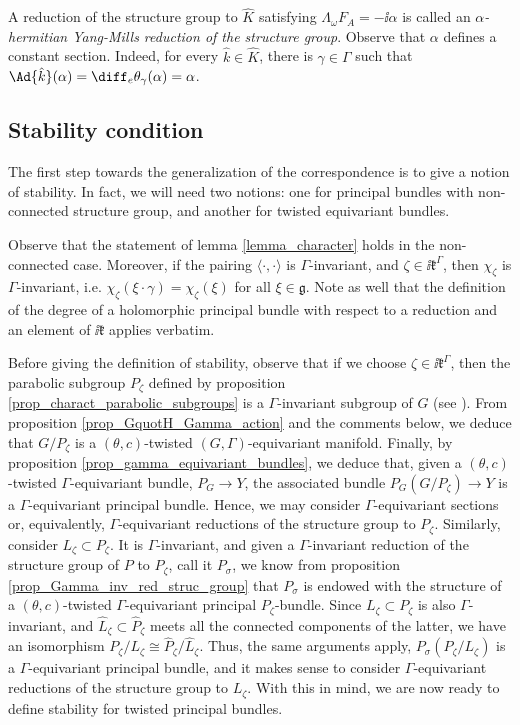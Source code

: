 \begin{obs}
    A reduction of the structure group to \(\hat{K}\) satisfying \(\Lambda_\omega F_A=-\ii \alpha\) is called an \(\alpha\)\textit{-hermitian Yang-Mills reduction of the structure group}. Observe that \(\alpha\) defines a constant section. Indeed, for every \(\hat{k}\in \hat{K}\), there is \(\gamma \in \Gamma\) such that \(\Ad{\hat{k}}(\alpha)=\diff_e \theta_{\gamma}(\alpha)=\alpha\).
\end{obs}

\subsection{Stability condition}
The first step towards the generalization of the correspondence is to give a notion of stability. In fact, we will need two notions: one for principal bundles with non-connected structure group, and another for twisted equivariant bundles. 

Observe that the statement of lemma \ref{lemma_character} holds in the non-connected case. Moreover, if the pairing \(\langle \cdot, \cdot \rangle\) is \(\Gamma\)-invariant, and \(\zeta \in \ii \mathfrak{k}^\Gamma\), then \(\chi_\zeta\) is \(\Gamma\)-invariant, i.e. \(\chi_\zeta(\xi \cdot \gamma)=\chi_\zeta(\xi)\) for all \(\xi \in \mathfrak{g}\). Note as well that the definition of the degree of a holomorphic principal bundle with respect to a reduction and an element of \(\ii \mathfrak{k}\) applies verbatim. 

Before giving the definition of stability, observe that if we choose \(\zeta \in \ii \mathfrak{k}^\Gamma\), then the parabolic subgroup \(P_\zeta\) defined by proposition \ref{prop_charact_parabolic_subgroups} is a \(\Gamma\)-invariant subgroup of \(G\) (see \parencite[Prop. 2.12]{HKnonconnected}). From proposition \ref{prop_GquotH_Gamma_action} and the comments below, we deduce that \(G/P_\zeta\) is a \((\theta, c)\)-twisted \((G, \Gamma)\)-equivariant manifold. Finally, by proposition \ref{prop_gamma_equivariant_bundles}, we deduce that, given a \((\theta,c)\)-twisted \(\Gamma\)-equivariant bundle, \(P_G\to Y\), the associated bundle \(P_G(G/P_\zeta)\to Y\) is a \(\Gamma\)-equivariant principal bundle. Hence, we may consider \(\Gamma\)-equivariant sections or, equivalently, \(\Gamma\)-equivariant reductions of the structure group to \(P_\zeta\). Similarly, consider \(L_\zeta \subset P_\zeta\). It is \(\Gamma\)-invariant, and given a \(\Gamma\)-invariant reduction of the structure group of \(P\) to \(P_\zeta\), call it \(P_\sigma\), we know from proposition \ref{prop_Gamma_inv_red_struc_group} that \(P_\sigma\) is endowed with the structure of a \((\theta,c)\)-twisted \(\Gamma\)-equivariant principal \(P_\zeta\)-bundle. Since \(L_\zeta\subset P_\zeta\) is also \(\Gamma\)-invariant, and \(\hat{L}_\zeta \subset \hat{P}_\zeta\) meets all the connected components of the latter, we have an isomorphism \(P_\zeta/L_\zeta\cong \hat{P}_\zeta/\hat{L}_\zeta\). Thus, the same arguments apply, \(P_\sigma(P_\zeta/L_\zeta)\) is a \(\Gamma\)-equivariant principal bundle, and it makes sense to consider \(\Gamma\)-equivariant reductions of the structure group to \(L_\zeta\). With this in mind, we are now ready to define stability for twisted principal bundles. 

